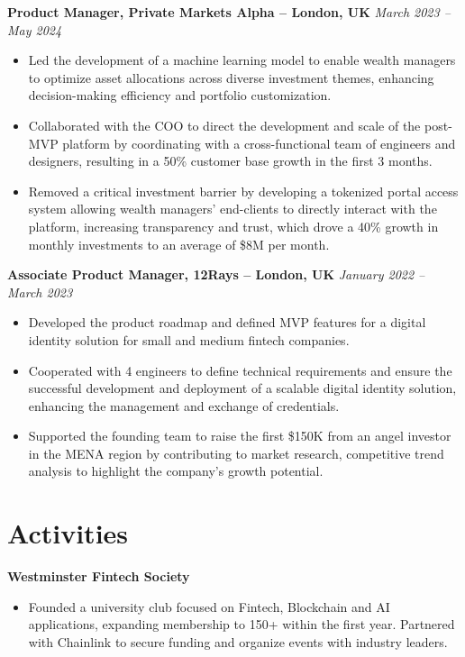 \documentclass{article}
\begin{document}
\textbf{Product Manager, Private Markets Alpha -- London, UK} \hfill \textit{March 2023 -- May 2024}
\begin{itemize}[leftmargin=*,noitemsep,topsep=0pt]
    \item Led the development of a machine learning model to enable wealth managers to optimize asset allocations across diverse investment themes, enhancing decision-making efficiency and portfolio customization.
    \item Collaborated with the COO to direct the development and scale of the post-MVP platform by coordinating with a cross-functional team of engineers and designers, resulting in a 50\% customer base growth in the first 3 months.
    \item Removed a critical investment barrier by developing a tokenized portal access system allowing wealth managers' end-clients to directly interact with the platform, increasing transparency and trust, which drove a 40\% growth in monthly investments to an average of \$8M per month.
\end{itemize}

\textbf{Associate Product Manager, 12Rays -- London, UK} \hfill \textit{January 2022 -- March 2023}
\begin{itemize}[leftmargin=*,noitemsep,topsep=0pt]
    \item Developed the product roadmap and defined MVP features for a digital identity solution for small and medium fintech companies.
    \item Cooperated with 4 engineers to define technical requirements and ensure the successful development and deployment of a scalable digital identity solution, enhancing the management and exchange of credentials.
    \item Supported the founding team to raise the first \$150K from an angel investor in the MENA region by contributing to market research, competitive trend analysis to highlight the company's growth potential.
\end{itemize}

\section*{Activities}
\textbf{Westminster Fintech Society}
\begin{itemize}[leftmargin=*,noitemsep,topsep=0pt]
    \item Founded a university club focused on Fintech, Blockchain and AI applications, expanding membership to 150+ within the first year. Partnered with Chainlink to secure funding and organize events with industry leaders.
\end{itemize}
\end{document}
